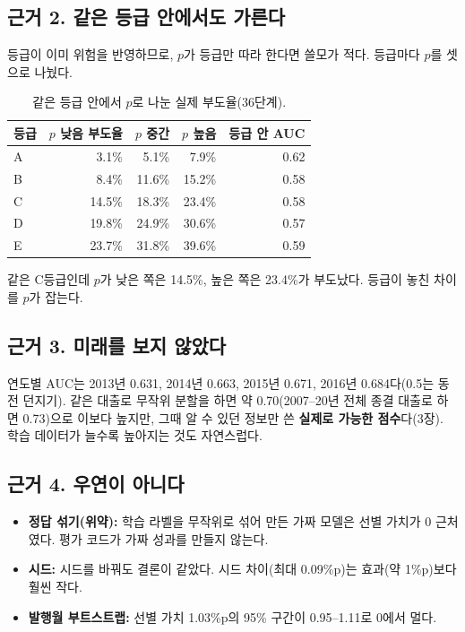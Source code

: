 \subsection*{근거 2. 같은 등급 안에서도 가른다}
등급이 이미 위험을 반영하므로, $p$가 등급만 따라 한다면 쓸모가 적다. 등급마다 $p$를 셋으로 나눴다.
\begin{table}[H]\centering\small
\begin{tabular}{@{}lrrrr@{}}\toprule
등급 & $p$ 낮음 부도율 & $p$ 중간 & $p$ 높음 & 등급 안 AUC\\\midrule
A & 3.1\% & 5.1\% & 7.9\% & 0.62\\
B & 8.4\% & 11.6\% & 15.2\% & 0.58\\
C & 14.5\% & 18.3\% & 23.4\% & 0.58\\
D & 19.8\% & 24.9\% & 30.6\% & 0.57\\
E & 23.7\% & 31.8\% & 39.6\% & 0.59\\\bottomrule
\end{tabular}
\caption{같은 등급 안에서 $p$로 나눈 실제 부도율(36단계).}
\end{table}
같은 C등급인데 $p$가 낮은 쪽은 14.5\%, 높은 쪽은 23.4\%가 부도났다. 등급이 놓친 차이를 $p$가 잡는다.

\subsection*{근거 3. 미래를 보지 않았다}
연도별 AUC는 2013년 0.631, 2014년 0.663, 2015년 0.671, 2016년 0.684다(0.5는 동전 던지기). 같은 대출로 무작위 분할을 하면 약 0.70(2007--20년 전체 종결 대출로 하면 0.73)으로 이보다 높지만, 그때 알 수 있던 정보만 쓴 \textbf{실제로 가능한 점수}다(3장). 학습 데이터가 늘수록 높아지는 것도 자연스럽다.

\subsection*{근거 4. 우연이 아니다}
\begin{itemize}[leftmargin=*]
\item \textbf{정답 섞기(위약):} 학습 라벨을 무작위로 섞어 만든 가짜 모델은 선별 가치가 0 근처였다. 평가 코드가 가짜 성과를 만들지 않는다.
\item \textbf{시드:} 시드를 바꿔도 결론이 같았다. 시드 차이(최대 0.09\%p)는 효과(약 1\%p)보다 훨씬 작다.
\item \textbf{발행월 부트스트랩:} 선별 가치 1.03\%p의 95\% 구간이 0.95--1.11로 0에서 멀다.
\end{itemize}

